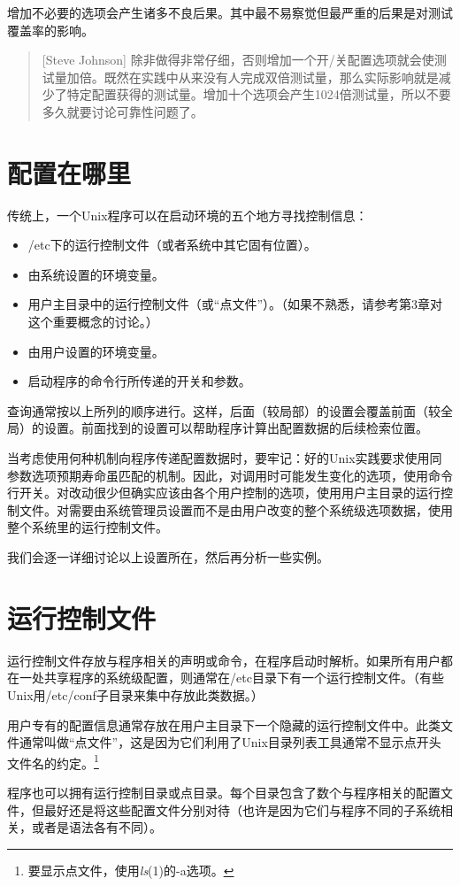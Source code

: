 \documentclass[12pt,oneside]{book}
\begin{document}
增加不必要的选项会产生诸多不良后果。其中最不易察觉但最严重的后果是对测试覆盖率的影响。
\begin{quote}[Steve Johnson]
除非做得非常仔细，否则增加一个开/关配置选项就会使测试量加倍。既然在实践中从来没有人完成双倍测试量，那么实际影响就是减少了特定配置获得的测试量。增加十个选项会产生1024倍测试量，所以不要多久就要讨论可靠性问题了。
\end{quote}

\section{配置在哪里}
传统上，一个Unix程序可以在启动环境的五个地方寻找控制信息：
\begin{itemize}
\item /etc下的运行控制文件（或者系统中其它固有位置）。
\item 由系统设置的环境变量。
\item 用户主目录中的运行控制文件（或“点文件”）。（如果不熟悉，请参考第3章对这个重要概念的讨论。）
\item 由用户设置的环境变量。
\item 启动程序的命令行所传递的开关和参数。
\end{itemize}

查询通常按以上所列的顺序进行。这样，后面（较局部）的设置会覆盖前面（较全局）的设置。前面找到的设置可以帮助程序计算出配置数据的后续检索位置。

当考虑使用何种机制向程序传递配置数据时，要牢记：好的Unix实践要求使用同参数选项预期寿命虽匹配的机制。因此，对调用时可能发生变化的选项，使用命令行开关。对改动很少但确实应该由各个用户控制的选项，使用用户主目录的运行控制文件。对需要由系统管理员设置而不是由用户改变的整个系统级选项数据，使用整个系统里的运行控制文件。

我们会逐一详细讨论以上设置所在，然后再分析一些实例。

\section{运行控制文件}
运行控制文件存放与程序相关的声明或命令，在程序启动时解析。如果所有用户都在一处共享程序的系统级配置，则通常在/etc目录下有一个运行控制文件。（有些Unix用/etc/conf子目录来集中存放此类数据。）

用户专有的配置信息通常存放在用户主目录下一个隐藏的运行控制文件中。此类文件通常叫做“点文件”，这是因为它们利用了Unix目录列表工具通常不显示点开头文件名的约定。\footnote{要显示点文件，使用\textit{ls}(1)的-a选项。}

程序也可以拥有运行控制目录或点目录。每个目录包含了数个与程序相关的配置文件，但最好还是将这些配置文件分别对待（也许是因为它们与程序不同的子系统相关，或者是语法各有不同）。
\end{document}
